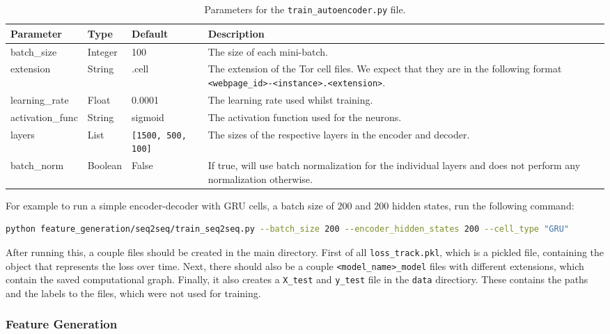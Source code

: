 \begin{table}[ht]
  \centering
  \begin{tabular}{ l | l | l | p{} }
    \textbf{Parameter} & \textbf{Type} & \textbf{Default} & \textbf{Description} \\ \hline \hline
    batch\_size & Integer & 100 & The size of each mini-batch. \\ \hline
    extension & String & .cell & The extension of the Tor cell files. We expect that they are in the following format \texttt{<webpage\_id>-<instance>.<extension>}. \\ \hline
    learning\_rate & Float & 0.0001 & The learning rate used whilst training. \\ \hline
    activation\_func & String & sigmoid & The activation function used for the neurons. \\ \hline
    layers & List & \texttt{[1500, 500, 100]} & The sizes of the respective layers in the encoder and decoder. \\ \hline
    batch\_norm & Boolean & False & If true, will use batch normalization for the individual layers and does not perform any normalization otherwise.
  \end{tabular}
  \caption{Parameters for the \texttt{train\_autoencoder.py} file.}
\end{table}

\newpage

\noindent
For example to run a simple encoder-decoder with GRU cells, a batch size of $200$ and $200$ hidden states, run the following command:
\begin{lstlisting}[language=Bash]
python feature_generation/seq2seq/train_seq2seq.py --batch_size 200 --encoder_hidden_states 200 --cell_type "GRU"
\end{lstlisting}

After running this, a couple files should be created in the main directory.
First of all \texttt{loss\_track.pkl}, which is a pickled file, containing the object that represents the loss over time.
Next, there should also be a couple \texttt{<model\_name>\_model} files with different extensions, which contain the saved computational graph.
Finally, it also creates a \texttt{X\_test} and \texttt{y\_test} file in the \texttt{data} directiory.
These contains the paths and the labels to the files, which were not used for training.

\newpage

\subsubsection{Feature Generation}

